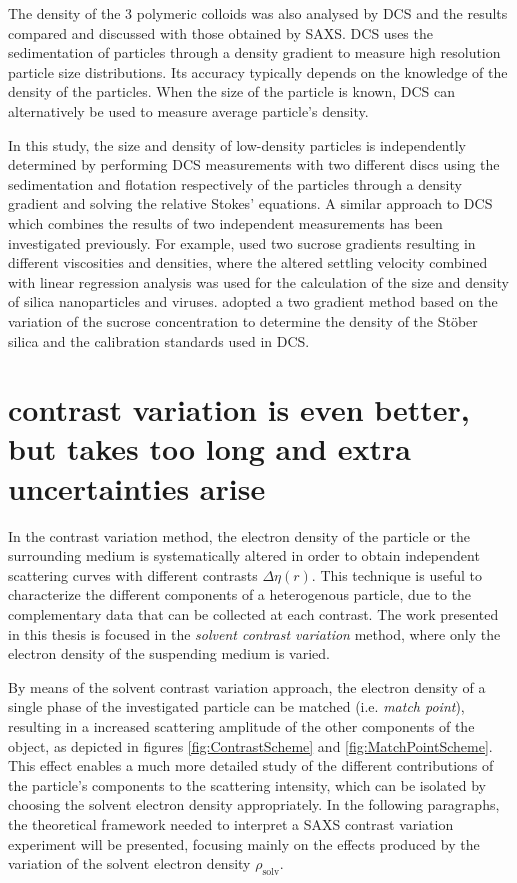 The density of the 3 polymeric colloids was also analysed by DCS and the results compared and discussed with those obtained by SAXS. DCS uses the sedimentation of particles through a density gradient to measure high resolution particle size distributions\citep{minelli_characterization_2014}. Its accuracy typically depends on the knowledge of the density of the particles. When the size of the particle is known, DCS can alternatively be used to measure average particle's density.

In this study, the size and density of low-density particles is independently determined by performing DCS measurements with two different discs using the sedimentation and flotation respectively of the particles through a density gradient and solving the relative Stokes' equations. A similar approach to DCS which combines the results of two independent measurements has been investigated previously. For example, \cite{neumann_new_2013} used two sucrose gradients resulting in different viscosities and densities, where the altered settling velocity combined with linear regression analysis was used for the calculation of the size and density of silica nanoparticles and viruses. \cite{bell_emerging_2012} adopted a two gradient method based on the variation of the sucrose concentration to determine the density of the St\"ober silica and the calibration standards used in DCS.

\section{contrast variation is even better, but takes too long and extra uncertainties arise}

In the contrast variation method, the electron density of the particle or the surrounding medium is systematically altered in order to obtain independent scattering curves with different contrasts $\Delta \eta (r)$. This technique is useful to characterize the different components of a heterogenous particle, due to the complementary data that can be collected at each contrast. The work presented in this thesis is focused in the \emph{solvent contrast variation} method, where only the electron density of the suspending medium is varied.

By means of the solvent contrast variation approach, the electron density of a single phase of the investigated particle can be matched (i.e. \emph{match point}), resulting in a increased scattering amplitude of the other components of the object, as depicted in figures \ref{fig:ContrastScheme} and \ref{fig:MatchPointScheme}. This effect enables a much more detailed study of the different contributions of the particle's components to the scattering intensity, which can be isolated by choosing the solvent electron density appropriately. In the following paragraphs, the theoretical framework needed to interpret a SAXS contrast variation experiment will be presented, focusing mainly on the effects produced by the variation of the solvent electron density $\rho_{\text{solv}}$.


